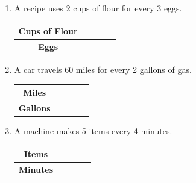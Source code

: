 \documentclass[12pt, letterpaper, fleqn]{article}
\begin{document}
\begin{enumerate}[itemsep=2cm, leftmargin=0.6cm]

\item A recipe uses 2 cups of flour for every 3 eggs.

\begin{center}
\begin{tabular}{|c|c|c|c|c|}
\hline
\textbf{Cups of Flour} & & & & \\
\hline
\textbf{Eggs} & & & & \\
\hline
\end{tabular}
\end{center}

\item A car travels 60 miles for every 2 gallons of gas.

\begin{center}
\begin{tabular}{|c|c|c|c|c|}
\hline
\textbf{Miles} & & & & \\
\hline
\textbf{Gallons} & & & & \\
\hline
\end{tabular}
\end{center}

\item A machine makes 5 items every 4 minutes.

\begin{center}
\begin{tabular}{|c|c|c|c|c|}
\hline
\textbf{Items} & & & & \\
\hline
\textbf{Minutes} & & & & \\
\hline
\end{tabular}
\end{center}

\end{enumerate}
\end{document}
